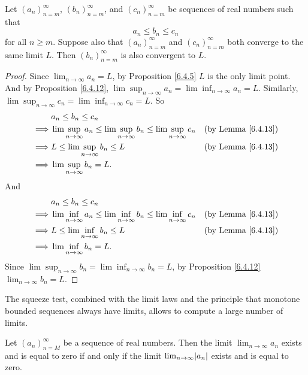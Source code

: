 \begin{corollary}\label{6.4.14}
Let \((a_n)_{n = m}^\infty\), \((b_n)_{n = m}^\infty\), and \((c_n)_{n = m}^\infty\) be sequences of real numbers such that
\[
    a_n \leq b_n \leq c_n
\]
for all \(n \geq m\).
Suppose also that \((a_n)_{n = m}^\infty\) and \((c_n)_{n = m}^\infty\) both converge to the same limit \(L\).
Then \((b_n)_{n = m}^\infty\) is also convergent to \(L\).
\end{corollary}

\begin{proof}
Since \(\lim_{n \to \infty} a_n = L\), by Proposition \ref{6.4.5} \(L\) is the only limit point.
And by Proposition \ref{6.4.12}, \(\lim\sup_{n \to \infty} a_n = \lim\inf_{n \to \infty} a_n = L\).
Similarly, \(\lim\sup_{n \to \infty} c_n = \lim\inf_{n \to \infty} c_n = L\).
So
\begin{align*}
& a_n \leq b_n \leq c_n \\
\implies & \lim\sup_{n \to \infty} a_n \leq \lim\sup_{n \to \infty} b_n \leq \lim\sup_{n \to \infty} c_n & \text{(by Lemma \ref{6.4.13})} \\
\implies & L \leq \lim\sup_{n \to \infty} b_n \leq L & \text{(by Lemma \ref{6.4.13})} \\
\implies & \lim\sup_{n \to \infty} b_n = L.
\end{align*}
And
\begin{align*}
& a_n \leq b_n \leq c_n \\
\implies & \lim\inf_{n \to \infty} a_n \leq \lim\inf_{n \to \infty} b_n \leq \lim\inf_{n \to \infty} c_n & \text{(by Lemma \ref{6.4.13})} \\
\implies & L \leq \lim\inf_{n \to \infty} b_n \leq L & \text{(by Lemma \ref{6.4.13})} \\
\implies & \lim\inf_{n \to \infty} b_n = L.
\end{align*}
Since \(\lim\sup_{n \to \infty} b_n = \lim\inf_{n \to \infty} b_n = L\), by Proposition \ref{6.4.12} \(\lim_{n \to \infty} b_n = L\).
\end{proof}

\setcounter{theorem}{15}
\begin{remark}\label{6.4.16}
The squeeze test, combined with the limit laws and the principle that monotone bounded sequences always have limits, allows to compute a large number of limits.
\end{remark}

\begin{corollary}\label{6.4.17}
Let \((a_n)_{n = M}^\infty\) be a sequence of real numbers.
Then the limit \(\lim_{n \to \infty} a_n\) exists and is equal to zero if and only if the limit \(\lim_{n \to \infty} \abs*{a_n}\) exists and is equal to zero.
\end{corollary}


